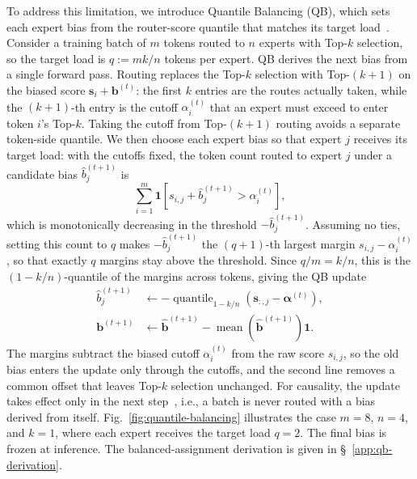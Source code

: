 To address this limitation, we introduce Quantile Balancing (QB), which sets each expert bias from the router-score quantile that matches its target load~\citep{su2026qb}.
Consider a training batch of $m$ tokens routed to $n$ experts with Top-$k$ selection, so the target load is $q:=mk/n$ tokens per expert.
QB derives the next bias from a single forward pass.
Routing replaces the Top-$k$ selection with Top-$(k{+}1)$ on the biased score $\bm{s}_i+\bm{b}^{(t)}$: the first $k$ entries are the routes actually taken, while the $(k{+}1)$-th entry is the cutoff $\alpha_i^{(t)}$ that an expert must exceed to enter token $i$'s Top-$k$.
Taking the cutoff from Top-$(k{+}1)$ routing avoids a separate token-side quantile.
We then choose each expert bias so that expert $j$ receives its target load: with the cutoffs fixed, the token count routed to expert $j$ under a candidate bias $\widehat{b}_j^{(t+1)}$ is
\begin{equation*}
    \sum_{i=1}^{m}\mathbf{1}\!\left[s_{i,j}+\widehat{b}_j^{(t+1)}>\alpha_i^{(t)}\right],
\end{equation*}
which is monotonically decreasing in the threshold $-\widehat{b}_j^{(t+1)}$.
Assuming no ties, setting this count to $q$ makes $-\widehat{b}_j^{(t+1)}$ the $(q{+}1)$-th largest margin $s_{i,j}-\alpha_i^{(t)}$, so that exactly $q$ margins stay above the threshold.
Since $q/m=k/n$, this is the $(1-k/n)$-quantile of the margins across tokens, giving the QB update
\begin{align}
    \widehat{b}_j^{(t+1)}
     & \leftarrow -\operatorname{quantile}_{1-k/n}\!\left(\bm{s}_{:,j}-\bm{\alpha}^{(t)}\right), \nonumber \\
    \bm{b}^{(t+1)}
     & \leftarrow \widehat{\bm{b}}^{(t+1)}
    - \operatorname{mean}\!\left(\widehat{\bm{b}}^{(t+1)}\right)\mathbf{1}.
    \label{eq:qb-update}
\end{align}
The margins subtract the biased cutoff $\alpha_i^{(t)}$ from the raw score $s_{i,j}$, so the old bias enters the update only through the cutoffs, and the second line removes a common offset that leaves Top-$k$ selection unchanged.
For causality, the update takes effect only in the next step~\citep{deepseekaiv3}, i.e., a batch is never routed with a bias derived from itself.
Fig.~\ref{fig:quantile-balancing} illustrates the case $m=8$, $n=4$, and $k=1$, where each expert receives the target load $q=2$.
The final bias is frozen at inference.
The balanced-assignment derivation is given in \S~\ref{app:qb-derivation}.

